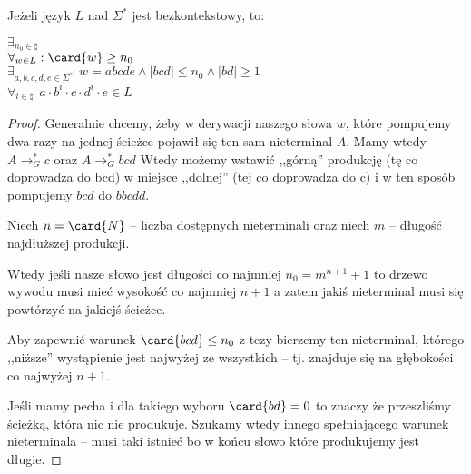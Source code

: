 \begin{theorem}
    Jeżeli język \(L\) nad \(\Sigma^*\) jest bezkontekstowy, to: 
    
    \( \exists_{n_0 \in \natural} \) \\
    \( \forall_{w \in L} : \card{w} \geq n_0 \) \\
    \( \exists_{a, b, c, d, e \in \Sigma^*} \hspace{5pt} w = abcde \land |bcd| \leq n_0 \land |bd| \geq 1 \) \\
    \( \forall_{i \in \natural} \hspace{5pt} a \cdot b^{i} \cdot c \cdot d^{i} \cdot e \in L\)
\end{theorem}
\begin{proof}
    Generalnie chcemy, żeby w derywacji naszego słowa \( w \), które pompujemy dwa razy na jednej ścieżce pojawił się ten sam nieterminal \( A \). Mamy wtedy \( A \rightarrow_G^* c\) oraz \( A \rightarrow_G^* bcd \) Wtedy możemy wstawić ,,górną'' produkcję (tę co doprowadza do bcd) w miejsce ,,dolnej'' (tej co doprowadza do c) i w ten sposób pompujemy \( bcd \) do  \( bbcdd \).
    
    Niech \( n = \card{N} \) -- liczba dostępnych nieterminali oraz niech \( m \) -- długość najdłuższej produkcji.
    
    Wtedy jeśli nasze słowo jest długości co najmniej \( n_0 = m^{n + 1} + 1 \) to drzewo wywodu musi mieć wysokość co najmniej \( n + 1 \) a zatem jakiś nieterminal musi się powtórzyć na jakiejś ścieżce.
    
    Aby zapewnić warunek \( \card{bcd} \leq n_0 \) z tezy bierzemy ten nieterminal, którego ,,niższe'' wystąpienie jest najwyżej ze wszystkich -- tj. znajduje się na głębokości co najwyżej \( n + 1 \).
    
    Jeśli mamy pecha i dla takiego wyboru \( \card{bd} = 0 \) to znaczy że przeszliśmy ścieżką, która nic nie produkuje. 
    Szukamy wtedy innego spełniającego warunek nieterminala -- musi taki istnieć bo w końcu słowo które produkujemy jest długie.
    
\end{proof}
